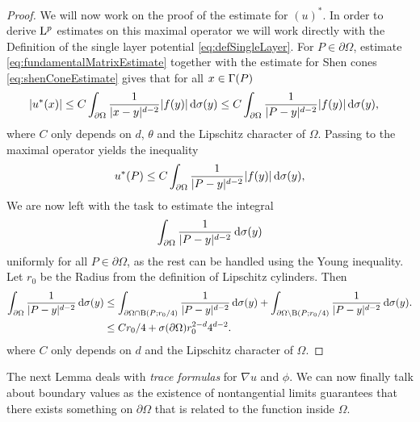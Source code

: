 \begin{proof}
  We will now work on the proof of the estimate for $(u)^*$.
  In order to derive $\mathrm{L}^p$ estimates on this maximal operator we will work directly with the Definition of the single layer potential \eqref{eq:defSingleLayer}.
  For $P \in \partial\Omega$, estimate \eqref{eq:fundamentalMatrixEstimate} together with the estimate for Shen cones \eqref{eq:shenConeEstimate} gives that for all $x \in \Gamma(P)$
  \begin{align*}
    |u^*(x)| 
    &\leq  C \int_{\partial\Omega} \frac{1}{|x - y|^{d - 2}} |f(y)| \, {\operatorname{d}\!{\sigma}}(y) 
    \leq  C \int_{\partial\Omega} \frac{1}{|P - y|^{d - 2}} |f(y)| \, {\operatorname{d}\!{\sigma}}(y),
  \end{align*}
  where $C$ only depends on $d$, $\theta$ and the Lipschitz character of $\Omega$.
  Passing to the maximal operator yields the inequality
  \begin{align*}
    u^*(P) \leq  C \int_{\partial\Omega} \frac{1}{|P - y|^{d - 2}} |f(y)| \, {\operatorname{d}\!{\sigma}}(y),
  \end{align*}
  We are now left with the task to estimate the integral 
  \begin{align*}
    \int_{\partial\Omega} \frac{1}{|P - y|^{d - 2}} \, {\operatorname{d}\!{\sigma}}(y)
  \end{align*}
  uniformly for all $P \in \partial\Omega$, as the rest can be handled using the Young inequality.
  Let $r_0$ be the Radius from the definition of Lipschitz cylinders.
  Then
  \begin{align*}
    \int_{\partial\Omega} \frac{1}{|P - y|^{d - 2}} \, {\operatorname{d}\!{\sigma}}(y)
    &\leq \int_{\partial\Omega \cap \mathrm{B}(P; r_0/4)} \frac{1}{|P - y|^{d - 2}} \, {\operatorname{d}\!{\sigma}}(y) + \int_{\partial\Omega \setminus \mathrm{B}(P; r_0/4)} \frac{1}{|P - y|^{d - 2}} \, {\operatorname{d}\!{\sigma}}(y). \\
    & \leq C r_0/4 +  \sigma(\partial\Omega) r_0^{2 - d} 4^{d - 2}.
  \end{align*}
  where $C$ only depends on $d$ and the Lipschitz character of $\Omega$.
\end{proof}

The next Lemma deals with \emph{trace formulas} for $\nabla u$ and $\phi$. We can now finally talk about boundary values as the existence of nontangential limits guarantees that there exists something on $\partial\Omega$ that is related to the function inside $\Omega$.

